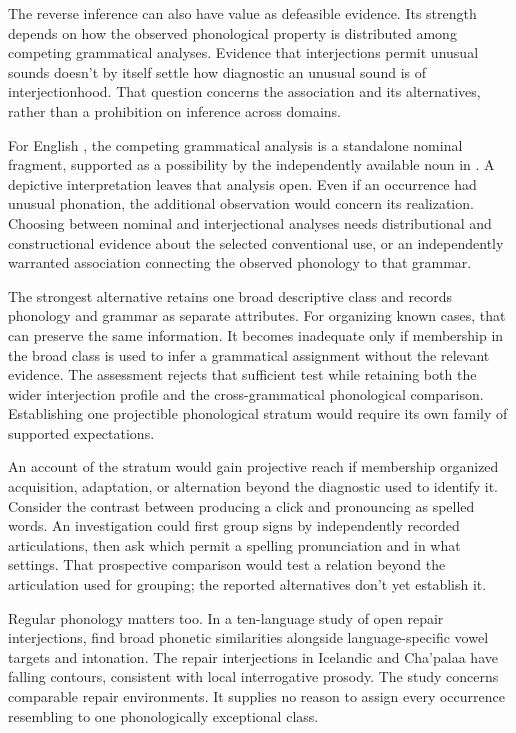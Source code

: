 \documentclass[12pt]{article}
\begin{document}
The reverse inference can also have value as defeasible evidence.
Its strength depends on how the observed phonological property is
distributed among competing grammatical analyses. Evidence that interjections
permit unusual sounds doesn't by itself settle how diagnostic an unusual
sound is of interjectionhood. That question concerns the association
and its alternatives, rather than a prohibition on inference across domains.

For English , the competing grammatical analysis is a
standalone nominal fragment, supported as a possibility by the independently
available noun in . A depictive interpretation leaves
that analysis open. Even if an occurrence had unusual phonation, the
additional observation would concern its realization. Choosing between
nominal and interjectional analyses needs distributional and constructional
evidence about the selected conventional use, or an independently warranted
association connecting the observed phonology to that grammar.

The strongest alternative retains one broad descriptive class and records
phonology and grammar as separate attributes. For organizing known cases,
that can preserve the same information. It becomes inadequate only if
membership in the broad class is used to infer a grammatical assignment
without the relevant evidence. The assessment rejects
that sufficient test while retaining both the wider interjection profile
and the cross-grammatical phonological comparison. Establishing one projectible
phonological stratum would require its own family of supported expectations.

An account of the stratum would gain projective reach if membership
organized acquisition, adaptation, or alternation beyond the diagnostic
used to identify it. Consider the contrast between producing a click
and pronouncing  as spelled words. An investigation
could first group signs by independently recorded articulations, then
ask which permit a spelling pronunciation and in what settings.
That prospective comparison would test a relation beyond the articulation
used for grouping; the reported alternatives don't yet establish it.

Regular phonology matters too. In a ten-language study of open repair
interjections, \textcite{dingemanse2013huh} find broad phonetic similarities
alongside language-specific vowel targets and intonation. The repair interjections in Icelandic and
Cha'palaa have falling contours, consistent with local interrogative
prosody. The study concerns comparable repair environments. It supplies
no reason to assign every occurrence resembling  to one
phonologically exceptional class.
\end{document}
